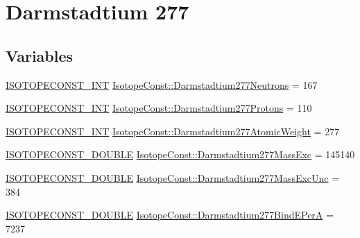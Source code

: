 \hypertarget{group___isotope_const-_darmstadtium-_ds277}{}\section{Darmstadtium 277}
\label{group___isotope_const-_darmstadtium-_ds277}
\subsection*{Variables}
\begin{DoxyCompactItemize}
\item 
\mbox{\hyperlink{group___isotope_const-_macros_ga5f18360b3e99483a35c32d789e62621c}{I\+S\+O\+T\+O\+P\+E\+C\+O\+N\+S\+T\+\_\+\+I\+NT}} \mbox{\hyperlink{group___isotope_const-_darmstadtium-_ds277_gad88eb6a28d56c83c808cced24bcadae8}{Isotope\+Const\+::\+Darmstadtium277\+Neutrons}} = 167
\item 
\mbox{\hyperlink{group___isotope_const-_macros_ga5f18360b3e99483a35c32d789e62621c}{I\+S\+O\+T\+O\+P\+E\+C\+O\+N\+S\+T\+\_\+\+I\+NT}} \mbox{\hyperlink{group___isotope_const-_darmstadtium-_ds277_gaa4207785e0aaae220757284d5a977734}{Isotope\+Const\+::\+Darmstadtium277\+Protons}} = 110
\item 
\mbox{\hyperlink{group___isotope_const-_macros_ga5f18360b3e99483a35c32d789e62621c}{I\+S\+O\+T\+O\+P\+E\+C\+O\+N\+S\+T\+\_\+\+I\+NT}} \mbox{\hyperlink{group___isotope_const-_darmstadtium-_ds277_ga5ad2cca04d68e89198be78655ad8842d}{Isotope\+Const\+::\+Darmstadtium277\+Atomic\+Weight}} = 277
\item 
\mbox{\hyperlink{group___isotope_const-_macros_ga8f45a7272ce02c0b4c65c44636ed719a}{I\+S\+O\+T\+O\+P\+E\+C\+O\+N\+S\+T\+\_\+\+D\+O\+U\+B\+LE}} \mbox{\hyperlink{group___isotope_const-_darmstadtium-_ds277_ga2062f519d47282dbda320f6a76368e96}{Isotope\+Const\+::\+Darmstadtium277\+Mass\+Exc}} = 145140
\item 
\mbox{\hyperlink{group___isotope_const-_macros_ga8f45a7272ce02c0b4c65c44636ed719a}{I\+S\+O\+T\+O\+P\+E\+C\+O\+N\+S\+T\+\_\+\+D\+O\+U\+B\+LE}} \mbox{\hyperlink{group___isotope_const-_darmstadtium-_ds277_gafeee3eaa2241fa267fb8b5380affa7cb}{Isotope\+Const\+::\+Darmstadtium277\+Mass\+Exc\+Unc}} = 384
\item 
\mbox{\hyperlink{group___isotope_const-_macros_ga8f45a7272ce02c0b4c65c44636ed719a}{I\+S\+O\+T\+O\+P\+E\+C\+O\+N\+S\+T\+\_\+\+D\+O\+U\+B\+LE}} \mbox{\hyperlink{group___isotope_const-_darmstadtium-_ds277_ga2c722d562d8826825cbbdaebab3e1ae6}{Isotope\+Const\+::\+Darmstadtium277\+Bind\+E\+PerA}} = 7237

\end{DoxyCompactItemize}
